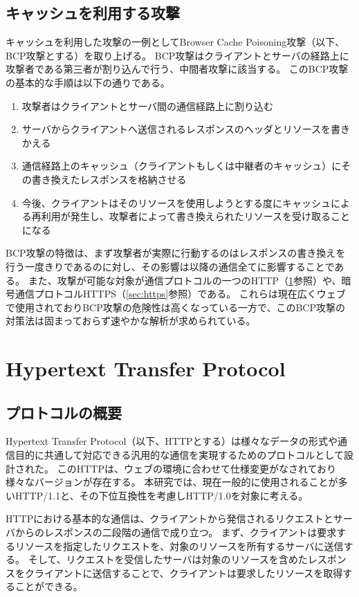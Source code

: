 \documentclass[12pt,a4paper]{jbook}
\begin{document}
\subsection{キャッシュを利用する攻撃}
キャッシュを利用した攻撃の一例としてBrowser Cache Poisoning攻撃（以下、BCP攻撃とする）\cite{bcpattack}を取り上げる。
BCP攻撃はクライアントとサーバの経路上に攻撃者である第三者が割り込んで行う、中間者攻撃に該当する。
このBCP攻撃の基本的な手順は以下の通りである。
\begin{enumerate}
\item 攻撃者はクライアントとサーバ間の通信経路上に割り込む
\item サーバからクライアントへ送信されるレスポンスのヘッダとリソースを書きかえる
\item 通信経路上のキャッシュ（クライアントもしくは中継者のキャッシュ）にその書き換えたレスポンスを格納させる
\item 今後、クライアントはそのリソースを使用しようとする度にキャッシュによる再利用が発生し、攻撃者によって書き換えられたリソースを受け取ることになる
\end{enumerate}

BCP攻撃の特徴は、まず攻撃者が実際に行動するのはレスポンスの書き換えを行う一度きりであるのに対し、その影響は以降の通信全てに影響することである。
また、攻撃が可能な対象が通信プロトコルの一つのHTTP（\ref{sec:http}参照）や、暗号通信プロトコルHTTPS（\ref{sec:https}参照）である。
これらは現在広くウェブで使用されておりBCP攻撃の危険性は高くなっている一方で、このBCP攻撃の対策法は固まっておらず速やかな解析が求められている。

\section{Hypertext Transfer Protocol}
\label{sec:http}
\subsection{プロトコルの概要}
Hypertext Transfer Protocol（以下、HTTPとする）は様々なデータの形式や通信目的に共通して対応できる汎用的な通信を実現するためのプロトコルとして設計された。
このHTTPは、ウェブの環境に合わせて仕様変更がなされており様々なバージョンが存在する。
本研究では、現在一般的に使用されることが多いHTTP/1.1\cite{rfc7230,rfc7231,rfc7232,rfc7233,rfc7234,rfc7235}と、その下位互換性を考慮しHTTP/1.0\cite{rfc1945}を対象に考える。

HTTPにおける基本的な通信は、クライアントから発信されるリクエストとサーバからのレスポンスの二段階の通信で成り立つ。
まず、クライアントは要求するリソースを指定したリクエストを、対象のリソースを所有するサーバに送信する。
そして、リクエストを受信したサーバは対象のリソースを含めたレスポンスをクライアントに送信することで、クライアントは要求したリソースを取得することができる。
\end{document}
